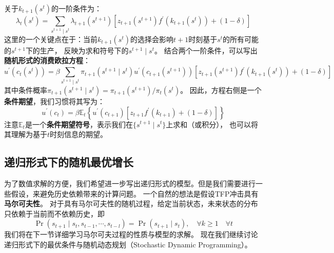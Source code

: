 关于$k_{t+1}\left(s^t\right)$的一阶条件为：
\begin{equation}    \label{eq-s-opt-growth-foc-k-sq}
    \lambda_t\left(s^t\right)=\sum_{s^{t+1} \mid s^t} \lambda_{t+1}\left(s^{t+1}\right)
        \left[z_{t+1}\left(s^{t+1}\right)f^{\prime}\left(k_{t+1}\left(s^t\right)\right)+\left(1-\delta\right)\right]
\end{equation}
这里的一个关键点在于：当前$k_{t+1}\left(s^t\right)$的选择会影响$t+1$时刻基于$s^t$的所有可能的$s^{t+1}$下的生产，
反映为求和符号下的$s^{t+1} \mid s^t$。
结合两个一阶条件，可以写出\textbf{随机形式的消费欧拉方程}：
\begin{equation}    \label{eq-s-opt-growth-euler1-sq}
    u^{\prime}\left(c_t\left(s^t\right)\right) = 
        \beta\sum_{s^{t+1}\mid s^t} \pi_{t+1}\left(s^{t+1}\mid s^t\right) u^{\prime}\left(c_{t+1}\left(s^{t+1}\right)\right)
            \left[z_{t+1}\left(s^{t+1}\right) f^{\prime}\left(k_{t+1}\left(s^t\right)\right)+\left(1-\delta\right)\right] 
\end{equation}
其中条件概率$\pi_{t+1}\left(s^{t+1}\mid s^t\right) =\pi_{t+1}\left(s^{t+1}\right)/\pi_t\left(s^t\right)$。
因此，方程右侧是一个\textbf{条件期望}，我们习惯将其写为：
\begin{equation}    \label{eq-s-opt-growth-euler2-sq}
    u^{\prime}\left(c_t\right) = 
        \beta\mathbb{E}_t\left\{u^{\prime}\left(c_{t+1}\right)
            \left[z_{t+1} f^{\prime}\left(k_{t+1}\right) + \left(1-\delta\right)\right]\right\}
\end{equation}
注意$\mathbb{E}_t$是一个\textbf{条件期望符号}，表示我们在$\{s^{t+1}\mid s^t\}$上求和（或积分），
也可以将其理解为基于$t$时刻信息的期望。


\subsection{递归形式下的随机最优增长}

为了数值求解的方便，我们希望进一步写出递归形式的模型。但是我们需要进行一些假设，来避免历史依赖带来的计算问题。
一个自然的想法是假设TFP冲击具有\textbf{马尔可夫性}。
对于具有马尔可夫性的随机过程，给定当前状态，未来状态的分布只依赖于当前而不依赖历史，即
\begin{equation}
    \operatorname{Pr}\left(s_{t+1}\mid s_t,s_{t-1},\cdots,s_{t-l}\right)
        = \operatorname{Pr}\left(s_{t+1}\mid s_t\right), \quad \forall k\geq 1 \quad \forall t
\end{equation}
我们将在下一节详细学习马尔可夫过程的性质与模型的求解。
现在我们继续讨论递归形式下的最优条件与随机动态规划（Stochastic Dynamic Programming）。

